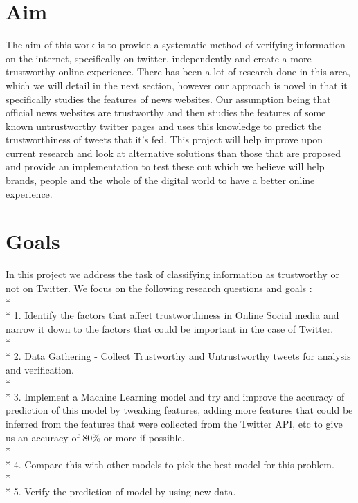 \section{Aim}
The aim of this work is to provide a systematic method of verifying information on the internet, specifically on twitter, independently and create a more trustworthy online experience. There has been a lot of research done in this area, which we will detail in the next section, however our approach is novel in that it specifically studies the features of news websites. Our assumption being that official news websites are trustworthy and then studies the features of some known untrustworthy twitter pages and uses this knowledge to predict the trustworthiness of tweets that it's fed. This project will help improve upon current research and look at alternative solutions than those that are proposed and provide an implementation to test these out which we believe will help brands, people and the whole of the digital world to have a better online experience. 

\section{Goals}
In this project we address the task of classifying information as trustworthy or not on Twitter. We focus on the following research questions and goals : \\*\\*
1. Identify the factors that affect trustworthiness in Online Social media and narrow it down to the factors that could be important in the case of Twitter. \\*\\*
2. Data Gathering - Collect Trustworthy and Untrustworthy tweets for analysis and verification.\\*\\*
3. Implement a Machine Learning model and try and improve the accuracy of prediction of this model by tweaking features, adding more features that could be inferred from the features that were collected from the Twitter API, etc to give us an accuracy of 80\% or more if possible.\\*\\*
4. Compare this with other models to pick the best model for this problem. \\*\\*
5. Verify the prediction of model by using new data.
